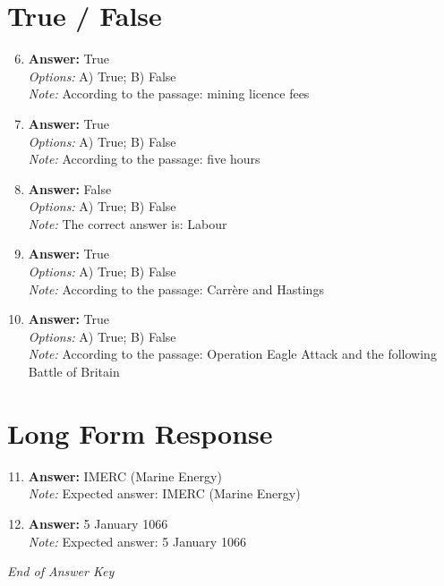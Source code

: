 \documentclass[12pt]{article}
\begin{document}
\section*{True / False}
\begin{enumerate}[label=\arabic*.]
\setcounter{enumi}{5}
\item \textbf{Answer:} True
\\ \textit{Options:} A) True; B) False
\\ \textit{Note:} According to the passage: mining licence fees
\item \textbf{Answer:} True
\\ \textit{Options:} A) True; B) False
\\ \textit{Note:} According to the passage: five hours
\item \textbf{Answer:} False
\\ \textit{Options:} A) True; B) False
\\ \textit{Note:} The correct answer is: Labour
\item \textbf{Answer:} True
\\ \textit{Options:} A) True; B) False
\\ \textit{Note:} According to the passage: Carrère and Hastings
\item \textbf{Answer:} True
\\ \textit{Options:} A) True; B) False
\\ \textit{Note:} According to the passage: Operation Eagle Attack and the following Battle of Britain
\end{enumerate}

\section*{Long Form Response}
\begin{enumerate}[label=\arabic*.]
\setcounter{enumi}{10}
\item \textbf{Answer:} IMERC (Marine Energy)
\\ \textit{Note:} Expected answer: IMERC (Marine Energy)
\item \textbf{Answer:} 5 January 1066
\\ \textit{Note:} Expected answer: 5 January 1066
\end{enumerate}

\vfill
\noindent\textit{End of Answer Key}
\end{document}
